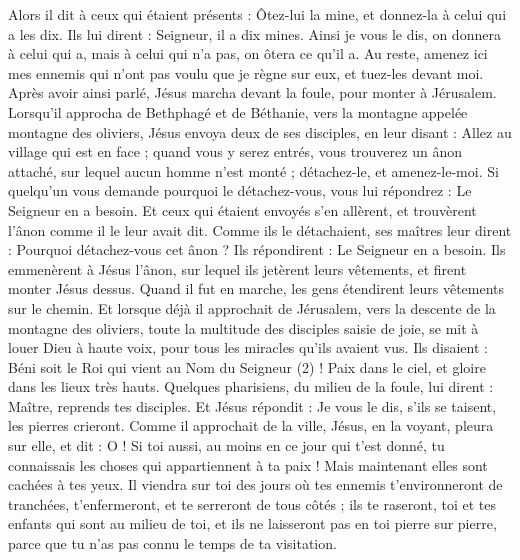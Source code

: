 \begin{multicols}{2}
Alors il dit à ceux qui étaient présents : Ôtez-lui la mine, et donnez-la à celui qui a les dix.
Ils lui dirent : Seigneur, il a dix mines.
Ainsi je vous le dis, on donnera à celui qui a, mais à celui qui n’a pas, on ôtera ce qu’il a.
Au reste, amenez ici mes ennemis qui n'ont pas voulu que je règne sur eux, et tuez-les devant moi.
Après avoir ainsi parlé, Jésus marcha devant la foule, pour monter à Jérusalem.
Lorsqu’il approcha de Bethphagé et de Béthanie, vers la montagne appelée montagne des oliviers, Jésus envoya deux de ses disciples,
en leur disant : Allez au village qui est en face ; quand vous y serez entrés, vous trouverez un ânon attaché, sur lequel aucun homme n'est monté ; détachez-le, et amenez-le-moi.
Si quelqu'un vous demande pourquoi le détachez-vous, vous lui répondrez : Le Seigneur en a besoin.
Et ceux qui étaient envoyés s'en allèrent, et trouvèrent l'ânon comme il le leur avait dit.
Comme ils le détachaient, ses maîtres leur dirent : Pourquoi détachez-vous cet ânon ?
Ils répondirent : Le Seigneur en a besoin.
Ils emmenèrent à Jésus l'ânon, sur lequel ils jetèrent leurs vêtements, et firent monter Jésus dessus.
Quand il fut en marche, les gens étendirent leurs vêtements sur le chemin.
Et lorsque déjà il approchait de Jérusalem, vers la descente de la montagne des oliviers, toute la multitude des disciples saisie de joie, se mit à louer Dieu à haute voix, pour tous les miracles qu'ils avaient vus.
Ils disaient : Béni soit le Roi qui vient au Nom du Seigneur (2) ! Paix dans le ciel, et gloire dans les lieux très hauts.
Quelques pharisiens, du milieu de la foule, lui dirent : Maître, reprends tes disciples.
Et Jésus répondit : Je vous le dis, s’ils se taisent, les pierres crieront.
Comme il approchait de la ville, Jésus, en la voyant, pleura sur elle, et dit :
O ! Si toi aussi, au moins en ce jour qui t’est donné, tu connaissais les choses qui appartiennent à ta paix ! Mais maintenant elles sont cachées à tes yeux.
Il viendra sur toi des jours où tes ennemis t'environneront de tranchées, t'enfermeront, et te serreront de tous côtés ;
ils te raseront, toi et tes enfants qui sont au milieu de toi, et ils ne laisseront pas en toi pierre sur pierre, parce que tu n'as pas connu le temps de ta visitation.

\end{multicols}

